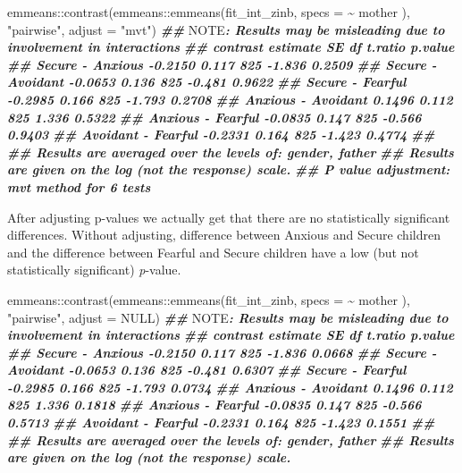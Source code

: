 \documentclass[
]{book}
\newenvironment{Shaded}{\begin{snugshade}}{\end{snugshade}}
\newcommand{\AlertTok}[1]{\textcolor[rgb]{0.94,0.16,0.16}{#1}}
\newcommand{\AttributeTok}[1]{\textcolor[rgb]{0.77,0.63,0.00}{#1}}
\newcommand{\ConstantTok}[1]{\textcolor[rgb]{0.00,0.00,0.00}{#1}}
\newcommand{\DocumentationTok}[1]{\textcolor[rgb]{0.56,0.35,0.01}{\textbf{\textit{#1}}}}
\newcommand{\FunctionTok}[1]{\textcolor[rgb]{0.00,0.00,0.00}{#1}}
\newcommand{\NormalTok}[1]{#1}
\newcommand{\SpecialCharTok}[1]{\textcolor[rgb]{0.00,0.00,0.00}{#1}}
\newcommand{\StringTok}[1]{\textcolor[rgb]{0.31,0.60,0.02}{#1}}
\begin{document}
\begin{Shaded}
\begin{Highlighting}[]
\NormalTok{emmeans}\SpecialCharTok{::}\FunctionTok{contrast}\NormalTok{(emmeans}\SpecialCharTok{::}\FunctionTok{emmeans}\NormalTok{(fit\_int\_zinb, }\AttributeTok{specs =} \SpecialCharTok{\textasciitilde{}}\NormalTok{ mother ),}
                  \StringTok{"pairwise"}\NormalTok{, }\AttributeTok{adjust =} \StringTok{"mvt"}\NormalTok{)}
\DocumentationTok{\#\# }\AlertTok{NOTE}\DocumentationTok{: Results may be misleading due to involvement in interactions}
\DocumentationTok{\#\#  contrast           estimate    SE  df t.ratio p.value}
\DocumentationTok{\#\#  Secure {-} Anxious    {-}0.2150 0.117 825  {-}1.836  0.2509}
\DocumentationTok{\#\#  Secure {-} Avoidant   {-}0.0653 0.136 825  {-}0.481  0.9622}
\DocumentationTok{\#\#  Secure {-} Fearful    {-}0.2985 0.166 825  {-}1.793  0.2708}
\DocumentationTok{\#\#  Anxious {-} Avoidant   0.1496 0.112 825   1.336  0.5322}
\DocumentationTok{\#\#  Anxious {-} Fearful   {-}0.0835 0.147 825  {-}0.566  0.9403}
\DocumentationTok{\#\#  Avoidant {-} Fearful  {-}0.2331 0.164 825  {-}1.423  0.4774}
\DocumentationTok{\#\# }
\DocumentationTok{\#\# Results are averaged over the levels of: gender, father }
\DocumentationTok{\#\# Results are given on the log (not the response) scale. }
\DocumentationTok{\#\# P value adjustment: mvt method for 6 tests}
\end{Highlighting}
\end{Shaded}

After adjusting p-values we actually get that there are no statistically significant differences. Without adjusting, difference between Anxious and Secure children and the difference between Fearful and Secure children have a low (but not statistically significant) \emph{p}-value.

\begin{Shaded}
\begin{Highlighting}[]
\NormalTok{emmeans}\SpecialCharTok{::}\FunctionTok{contrast}\NormalTok{(emmeans}\SpecialCharTok{::}\FunctionTok{emmeans}\NormalTok{(fit\_int\_zinb, }\AttributeTok{specs =} \SpecialCharTok{\textasciitilde{}}\NormalTok{ mother ),}
                  \StringTok{"pairwise"}\NormalTok{, }\AttributeTok{adjust =} \ConstantTok{NULL}\NormalTok{)}
\DocumentationTok{\#\# }\AlertTok{NOTE}\DocumentationTok{: Results may be misleading due to involvement in interactions}
\DocumentationTok{\#\#  contrast           estimate    SE  df t.ratio p.value}
\DocumentationTok{\#\#  Secure {-} Anxious    {-}0.2150 0.117 825  {-}1.836  0.0668}
\DocumentationTok{\#\#  Secure {-} Avoidant   {-}0.0653 0.136 825  {-}0.481  0.6307}
\DocumentationTok{\#\#  Secure {-} Fearful    {-}0.2985 0.166 825  {-}1.793  0.0734}
\DocumentationTok{\#\#  Anxious {-} Avoidant   0.1496 0.112 825   1.336  0.1818}
\DocumentationTok{\#\#  Anxious {-} Fearful   {-}0.0835 0.147 825  {-}0.566  0.5713}
\DocumentationTok{\#\#  Avoidant {-} Fearful  {-}0.2331 0.164 825  {-}1.423  0.1551}
\DocumentationTok{\#\# }
\DocumentationTok{\#\# Results are averaged over the levels of: gender, father }
\DocumentationTok{\#\# Results are given on the log (not the response) scale.}
\end{Highlighting}
\end{Shaded}
\end{document}
